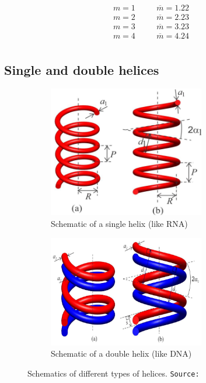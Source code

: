 \begin{refsection}
\begin{equation*}
    \begin{aligned}
        m = 1 &\quad& \overline{m}=1.22\\
        m = 2 &\quad& \overline{m}=2.23\\
        m = 3 &\quad& \overline{m}=3.23\\
        m = 4 &\quad& \overline{m}=4.24\\
    \end{aligned}
\end{equation*}

\subsection*{Single and double helices}
  
\begin{figure}[!htb]
    \centering
    \begin{subfigure}[b]{0.45\textwidth}
                \centering
                \includegraphics[width=0.75\textwidth]{figs/singlehelix.png}
                \caption{Schematic of a single helix (like RNA)}
                \label{fig:singlehelix1}
        \end{subfigure}%
        \begin{subfigure}[b]{0.45\textwidth}
                \centering
                \includegraphics[width=0.75\textwidth]{figs/doublehelix.png}
                \caption{Schematic of a double helix (like DNA)}
                \label{fig:doublehelix1}
        \end{subfigure}
        \caption{Schematics of different types of helices. \texttt{Source:~\cite{pathak_diffraction_2015}}}
\end{figure}


\end{refsection}
